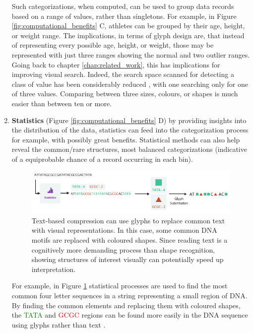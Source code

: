 \begin{enumerate}
Such categorizations, when computed, can be used to group data records based on a range of values, rather than singletons.
For example, in Figure \ref{fig:computational_benefits} C, athletes can be grouped by their age, height, or weight range.
The implications, in terms of glyph design are, that instead of representing every possible age, height, or weight, those may be represented with just three ranges showing the normal and two outlier ranges.
Going back to chapter \ref{chap:related_work}, this has implications for improving visual search. Indeed, the search space scanned for detecting a class of value has been considerably reduced , with one searching only for one of three values. Comparing between three sizes, colours, or shapes is much easier than between ten or more.

\item \textbf{Statistics} (Figure \ref{fig:computational_benefits} D) by providing insights into the distribution of the data,  statistics can feed into the categorization process for example, with possibly great benefits.
Statistical methods can also help reveal the common/rare structures, most balanced categorizations (indicative of a equiprobable chance of a record occurring in each bin).

\begin{figure}[h!]
\centering
\includegraphics[width=\textwidth]{images/ch3/statistics_compression}
\caption{Text-based compression can use glyphs to replace common text with visual representations.
In this case, some common DNA motifs are replaced with coloured shapes.
Since reading text is a cognitively more demanding process than shape recognition, showing structures of interest visually can potentially speed up interpretation.
}
\label{fig:text_compress_glyph}
\end{figure}

For example, in Figure \ref{fig:text_compress_glyph} statistical processes are used to find the most common four letter sequences in a string representing a small region of DNA.
By finding the common elements and replacing them with coloured shapes, the \textcolor{green}{TATA} and \textcolor{red}{GCGC} regions can be found more easily in the DNA sequence using glyphs rather than text \cite{sperling60}.


\end{enumerate}
